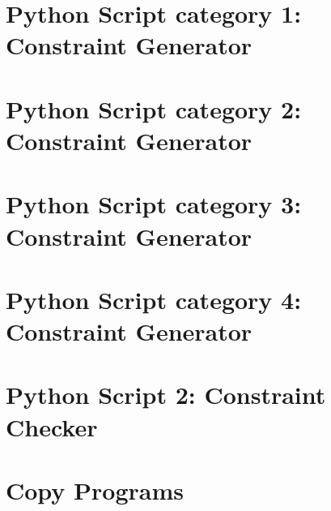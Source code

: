 \documentclass[project,twoside]{iitbreport}
\begin{document}
\renewcommand{\abstractname}{\LARGE Acknowledgements}


{}
\let\cleardoublepage\clearpage
\tableofcontents
\listoffigures
\lstlistoflistings
\newpage
\let\cleardoublepage\clearpage
\setcounter{page}{1}













\begin{appendices}
	\chapter{Python Script category 1: Constraint Generator}
	\label{ch:p1}
	
	\chapter{Python Script category 2: Constraint Generator}
	\label{ch:p2}
	
	\chapter{Python Script category 3: Constraint Generator}
	\label{ch:p3}
	
	\chapter{Python Script category 4: Constraint Generator}
	\label{ch:p4}
	
	\chapter{Python Script 2: Constraint Checker}
	\label{ch:script2}
	
	\chapter{Copy Programs}
	\label{ch:programs}
	
	
\end{appendices}



%
\end{document}
